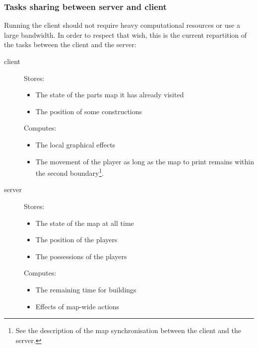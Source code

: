 \documentclass{article}
\begin{document}
\subsubsection{Tasks sharing between server and client}
Running the client should not require heavy computational resources or use a
large bandwidth. In order to respect that wish, this is the current repartition
of the tasks between the client and the server:
\begin{description}
	\item[client]
		Stores:
			\begin{itemize}
				\item The state of the parts map it has already visited
				\item The position of some constructions
			\end{itemize}

		Computes:
			\begin{itemize}
				\item The local graphical effects
				\item The movement of the player as long as the map to print
				remains within the second boundary\footnote{See the description
				of the map synchronisation between the client and the server.}.
			\end{itemize}
	\item[server]
		Stores:
			\begin{itemize}
				\item The state of the map at all time
				\item The position of the players
				\item The possessions of the players
			\end{itemize}

		Computes:
			\begin{itemize}
				\item The remaining time for buildings
				\item Effects of map-wide actions
			\end{itemize}
\end{description}

\medskip
\end{document}
